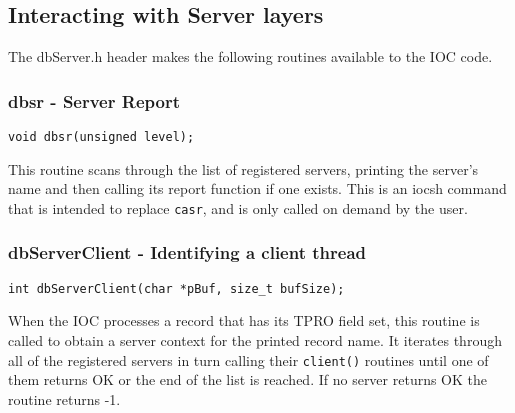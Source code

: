 \subsection{Interacting with Server layers}

The dbServer.h header makes the following routines available to the IOC code.

\subsubsection{dbsr - Server Report}

\begin{verbatim}
void dbsr(unsigned level);
\end{verbatim}

This routine scans through the list of registered servers, printing the server's name and then calling its report function if one exists.
This is an iocsh command that is intended to replace \verb|casr|, and is only called on demand by the user.

\subsubsection{dbServerClient - Identifying a client thread}

\begin{verbatim}
int dbServerClient(char *pBuf, size_t bufSize);
\end{verbatim}

When the IOC processes a record that has its TPRO field set, this routine is called to obtain a server context for the printed record name.
It iterates through all of the registered servers in turn calling their \verb|client()| routines until one of them returns OK or the end of the list is reached.
If no server returns OK the routine returns -1.


